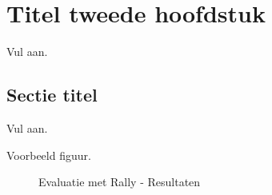 \chapter{Titel tweede hoofdstuk}
\label{chap:evaluation}

Vul aan.

\lipsum[9-10]

\section{Sectie titel}
\label{sec:scalable_faafo}

Vul aan.

\lipsum[10-12]
Voorbeeld figuur.

\begin{figure}
	\centering
	\par\medskip
	\caption{Evaluatie met Rally - Resultaten}
	\label{fig:evaluation_rally}
\end{figure}
